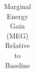 \begin{table}
\caption{Marginal Energy Gain (MEG) Relative to Baseline}
\label{tab:marginal_energy_gain}
\begin{tabular}{}
\toprule
\midrule
\bottomrule
\end{tabular}
\end{table}
